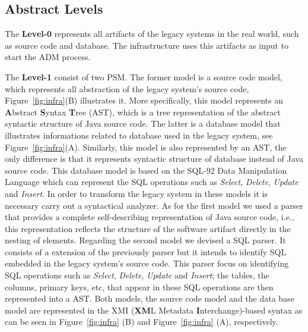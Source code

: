\subsection{Abstract Levels}\label{subsection:abstract_level}
The \textbf{Level-0} represents all artifacts of the legacy systems in the real world, such as source code and database. The infrastructure uses this artifacts as input to start the ADM process.

The \textbf{Level-1} consist of two PSM. The former model is a source code model, which represents all abstraction of the legacy system's source code, Figure~\ref{fig:infra}(B) illustrates it. More specifically, this model represents an \textbf{A}bstract \textbf{S}yntax \textbf{T}ree (AST), which is a tree representation of the abstract syntactic structure of Java source code. The latter is a database model that illustrates informations related to database used in the legacy system, see Figure~\ref{fig:infra}(A). Similarly, this model is also represented by an AST, the only difference is that it represents syntactic structure of database instead of Java source code. This database model is based on the SQL-92 Data Manipulation Language which can represent the SQL operations such as \textit{Select}, \textit{Delete}, \textit{Update} and \textit{Insert}. In order to transform the legacy system in these models it is necessary carry out a syntactical analyzer. As for the first model we used a parser that provides a complete self-describing representation of Java source code, i.e., this representation reflects the structure of the software artifact directly in the nesting of elements. Regarding the second model we devised a SQL parser. It consists of a extension of the previously parser but it intends to identify SQL embedded in the legacy system's source code. This parser focus on identifying SQL operations such as \textit{Select}, \textit{Delete}, \textit{Update} and \textit{Insert}; the tables, the columns, primary keys, etc, that appear in these SQL operations are then represented into a AST. Both models, the source code model and the data base model  are represented in the XMI (\textbf{XM}L Metadata \textbf{I}nterchange)-based syntax as can be seen in Figure~\ref{fig:infra} (B) and Figure~\ref{fig:infra} (A), respectively.   



